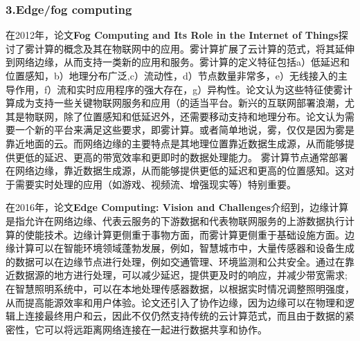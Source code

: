 \documentclass[a4paper,twoside]{scrbook}
\begin{document}
\subsubsection{3.Edge/fog computing}
在2012年，论文\textbf{Fog Computing and Its Role in the Internet of Things}探讨了雾计算的概念及其在物联网中的应用。雾计算扩展了云计算的范式，将其延伸到网络边缘，从而支持一类新的应用和服务。雾计算的定义特征包括a）低延迟和位置感知，b）地理分布广泛,c）流动性，d）节点数量非常多，e）无线接入的主导作用，f）流和实时应用程序的强大存在，g）异构性。论文认为这些特征使雾计算成为支持一些关键物联网服务和应用（的适当平台。新兴的互联网部署浪潮，尤其是物联网，除了位置感知和低延迟外，还需要移动支持和地理分布。论文认为需要一个新的平台来满足这些要求，即雾计算。或者简单地说，雾，仅仅是因为雾是靠近地面的云。而网络边缘的主要特点是其地理位置靠近数据生成源，从而能够提供更低的延迟、更高的带宽效率和更即时的数据处理能力。
雾计算节点通常部署在网络边缘，靠近数据生成源，从而能够提供更低的延迟和更高的位置感知。这对于需要实时处理的应用（如游戏、视频流、增强现实等）特别重要。

在2016年，论文\textbf{Edge Computing: Vision and Challenges}介绍到，边缘计算是指允许在网络边缘、代表云服务的下游数据和代表物联网服务的上游数据执行计算的使能技术。边缘计算更侧重于事物方面，而雾计算更侧重于基础设施方面。边缘计算可以在智能环境领域蓬勃发展，例如，智慧城市中，大量传感器和设备生成的数据可以在边缘节点进行处理，例如交通管理、环境监测和公共安全。通过在靠近数据源的地方进行处理，可以减少延迟，提供更及时的响应，并减少带宽需求;在智慧照明系统中，可以在本地处理传感器数据，以根据实时情况调整照明强度，从而提高能源效率和用户体验。论文还引入了协作边缘，因为边缘可以在物理和逻辑上连接最终用户和云，因此不仅仍然支持传统的云计算范式，而且由于数据的紧密性，它可以将远距离网络连接在一起进行数据共享和协作。
\end{document}
